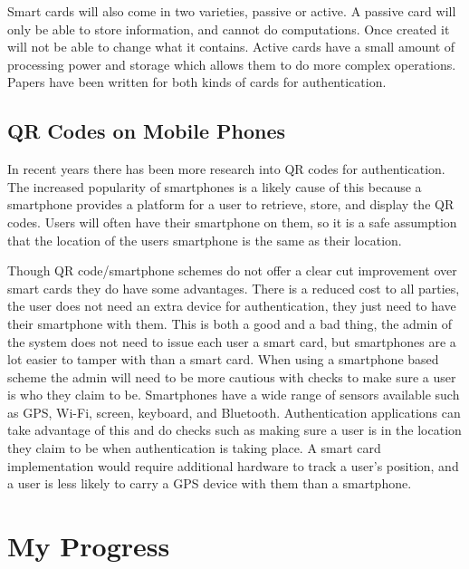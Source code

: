 \documentclass[]{report}   %
\begin{document}
Smart cards will also come in two varieties, passive or active. A passive card will only be able to store information, and cannot do computations. Once created it will not be able to change what it contains. Active cards have a small amount of processing power and storage which allows them to do more complex operations. Papers have been written for both kinds of cards for authentication.

\subsection{QR Codes on Mobile Phones}
In recent years there has been more research into QR codes for authentication. The increased popularity of smartphones is a likely cause of this because a smartphone provides a platform for a user to retrieve, store, and display the QR codes. Users will often have their smartphone on them, so it is a safe assumption that the location of the users smartphone is the same as their location.

Though QR code/smartphone schemes do not offer a clear cut improvement over smart cards they do have some advantages. There is a reduced cost to all parties, the user does not need an extra device for authentication, they just need to have their smartphone with them. This is both a good and a bad thing, the admin of the system does not need to issue each user a smart card, but smartphones are a lot easier to tamper with than a smart card. When using a smartphone based scheme the admin will need to be more cautious with checks to make sure a user is who they claim to be. Smartphones have a wide range of sensors available such as GPS, Wi-Fi, screen, keyboard, and Bluetooth. Authentication applications can take advantage of this and do checks such as making sure a user is in the location they claim to be when authentication is taking place. A smart card implementation would require additional hardware to track a user's position, and a user is less likely to carry a GPS device with them than a smartphone.

\section{My Progress}
\end{document}
